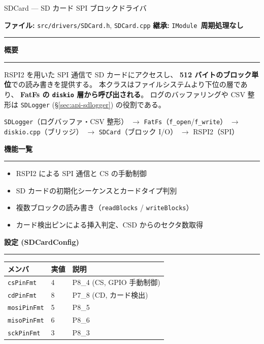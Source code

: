 \documentclass[a4paper,11pt,dvipdfmx]{jsarticle}
\makeatletter
\newcommand{\apisection}[1]{%
  \par\addvspace{4mm}%
  {\normalsize\bfseries\color{headerblue} #1}%
  \par\vspace{-1mm}%
  {\color{accentblue!40}\rule{\linewidth}{0.5pt}}%
  \par\nobreak\vspace{2mm}%
  \@afterheading
}
\newcommand{\phasebadge}[1]{%
  \colorbox{accentblue!10}{\small\bfseries\color{accentblue!80!black}\,#1\,}%
}
\makeatother
\begin{document}
\begin{apibox}{SDCard --- SD カード SPI ブロックドライバ}

\textbf{ファイル:} \texttt{src/drivers/SDCard.h}, \texttt{SDCard.cpp} \hfill
\textbf{継承:} \texttt{IModule} \hfill
\phasebadge{周期処理なし}

\vspace{2mm}\hrule\vspace{2mm}

\apisection{概要}

RSPI2 を用いた SPI 通信で SD カードにアクセスし、
\textbf{512 バイトのブロック単位}での読み書きを提供する。
本クラスはファイルシステムより下位の層であり、
\textbf{FatFs の \texttt{diskio} 層から呼び出される}。
ログのバッファリングや CSV 整形は
\texttt{SDLogger} (\hyperref[sec:api-sdlogger]{§\ref*{sec:api-sdlogger}}) の役割である。

\begin{notebox}[レイヤ構成]
\texttt{SDLogger}（ログバッファ・CSV 整形）
$\rightarrow$ \texttt{FatFs}（\texttt{f\_open}/\texttt{f\_write}）
$\rightarrow$ \texttt{diskio.cpp}（ブリッジ）
$\rightarrow$ \texttt{SDCard}（ブロック I/O）
$\rightarrow$ RSPI2（SPI）
\end{notebox}

\apisection{機能一覧}

\begin{itemize}[nosep]
  \item RSPI2 による SPI 通信と CS の手動制御
  \item SD カードの初期化シーケンスとカードタイプ判別
  \item 複数ブロックの読み書き（\texttt{readBlocks} / \texttt{writeBlocks}）
  \item カード検出ピンによる挿入判定、CSD からのセクタ数取得
\end{itemize}

\apisection{設定 (SDCardConfig)}

\begin{tabularx}{\textwidth}{l l X}
\toprule
\textbf{メンバ} & \textbf{実値} & \textbf{説明} \\
\midrule
\texttt{csPinFmt}   & 4 & P8\_4 (CS, GPIO 手動制御) \\
\texttt{cdPinFmt}   & 8 & P7\_8 (CD, カード検出) \\
\texttt{mosiPinFmt} & 5 & P8\_5 \\
\texttt{misoPinFmt} & 6 & P8\_6 \\
\texttt{sckPinFmt}  & 3 & P8\_3 \\
\bottomrule
\end{tabularx}


\end{apibox}
\end{document}
